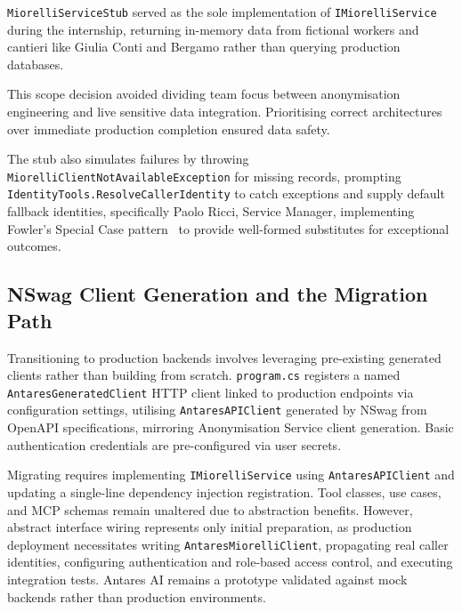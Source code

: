 \texttt{MiorelliServiceStub} served as the sole implementation of \texttt{IMiorelliService} during the internship, returning in-memory data from fictional workers and cantieri like Giulia Conti and Bergamo rather than querying production databases.

This scope decision avoided dividing team focus between anonymisation engineering and live sensitive data integration. Prioritising correct architectures over immediate production completion ensured data safety.

The stub also simulates failures by throwing \texttt{MiorelliClientNotAvailableException} for missing records, prompting \texttt{IdentityTools.ResolveCallerIdentity} to catch exceptions and supply default fallback identities, specifically Paolo Ricci, Service Manager, implementing Fowler's Special Case pattern~\cite{fowler2002specialcase} to provide well-formed substitutes for exceptional outcomes.

\subsection{NSwag Client Generation and the Migration Path}
\label{subsec:impl_nswag_migration}

Transitioning to production backends involves leveraging pre-existing generated clients rather than building from scratch. \texttt{program.cs} registers a named \texttt{AntaresGeneratedClient} HTTP client linked to production endpoints via configuration settings, utilising \texttt{AntaresAPIClient} generated by NSwag from OpenAPI specifications, mirroring Anonymisation Service client generation. Basic authentication credentials are pre-configured via user secrets.

Migrating requires implementing \texttt{IMiorelliService} using \texttt{AntaresAPIClient} and updating a single-line dependency injection registration. Tool classes, use cases, and MCP schemas remain unaltered due to abstraction benefits. However, abstract interface wiring represents only initial preparation, as production deployment necessitates writing \texttt{AntaresMiorelliClient}, propagating real caller identities, configuring authentication and role-based access control, and executing integration tests. Antares AI remains a prototype validated against mock backends rather than production environments.
